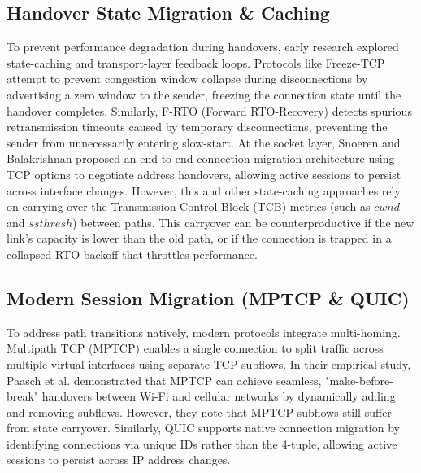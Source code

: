 \documentclass[conference]{IEEEtran}
\begin{document}
\subsection{Handover State Migration \& Caching}
To prevent performance degradation during handovers, early research explored state-caching and transport-layer feedback loops. Protocols like Freeze-TCP \cite{goff2000freeze} attempt to prevent congestion window collapse during disconnections by advertising a zero window to the sender, freezing the connection state until the handover completes. Similarly, F-RTO (Forward RTO-Recovery) \cite{sarolahti2009f_rto} detects spurious retransmission timeouts caused by temporary disconnections, preventing the sender from unnecessarily entering slow-start. At the socket layer, Snoeren and Balakrishnan \cite{snoeren2000end} proposed an end-to-end connection migration architecture using TCP options to negotiate address handovers, allowing active sessions to persist across interface changes. However, this and other state-caching approaches rely on carrying over the Transmission Control Block (TCB) metrics (such as $cwnd$ and $ssthresh$) between paths. This carryover can be counterproductive if the new link's capacity is lower than the old path, or if the connection is trapped in a collapsed RTO backoff that throttles performance.

\subsection{Modern Session Migration (MPTCP \& QUIC)}
To address path transitions natively, modern protocols integrate multi-homing. Multipath TCP (MPTCP) \cite{rfc8684} enables a single connection to split traffic across multiple virtual interfaces using separate TCP subflows. In their empirical study, Paasch et al. \cite{paasch2012exploring} demonstrated that MPTCP can achieve seamless, "make-before-break" handovers between Wi-Fi and cellular networks by dynamically adding and removing subflows. However, they note that MPTCP subflows still suffer from state carryover.
Similarly, QUIC \cite{rfc9000} supports native connection migration by identifying connections via unique IDs rather than the 4-tuple, allowing active sessions to persist across IP address changes.
\end{document}
